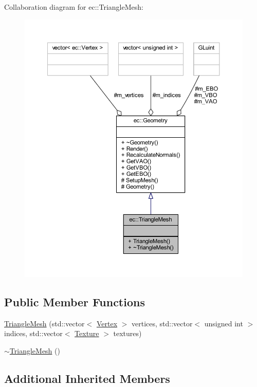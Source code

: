 Collaboration diagram for ec\+:\+:Triangle\+Mesh\+:
\nopagebreak
\begin{figure}[H]
\begin{center}
\leavevmode
\includegraphics[width=350pt]{classec_1_1_triangle_mesh__coll__graph}
\end{center}
\end{figure}
\subsection*{Public Member Functions}
\begin{DoxyCompactItemize}
\item 
\mbox{\hyperlink{classec_1_1_triangle_mesh_aac37d81b92c1140706179fe062ca8342}{Triangle\+Mesh}} (std\+::vector$<$ \mbox{\hyperlink{structec_1_1_vertex}{Vertex}} $>$ vertices, std\+::vector$<$ unsigned int $>$ indices, std\+::vector$<$ \mbox{\hyperlink{classec_1_1_texture}{Texture}} $>$ textures)
\item 
\mbox{\hyperlink{classec_1_1_triangle_mesh_a4b22f588bc354df2b6f7357993f44193}{$\sim$\+Triangle\+Mesh}} ()
\end{DoxyCompactItemize}
\subsection*{Additional Inherited Members}


